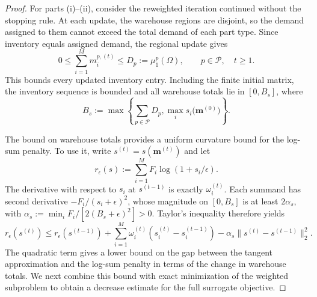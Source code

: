 \documentclass[a4paper,fleqn]{cas-sc}
\theoremstyle{remark}
\theoremstyle{plain}
\begin{document}
\begin{proof}
For parts (i)--(ii), consider the reweighted iteration continued without the stopping rule. At each update, the warehouse regions are disjoint, so the demand assigned to them cannot exceed the total demand of each part type. Since inventory equals assigned demand, the regional update gives
\[
    0\le\sum_{i=1}^M m_i^{p,(t)}\le D_p:=\mu_1^p(\Omega),\qquad p\in\mathcal P,\quad t\ge1.
\]
This bounds every updated inventory entry. Including the finite initial matrix, the inventory sequence is bounded and all warehouse totals lie in $[0,B_s]$, where
\[
    B_s:=\max\left\{\sum_{p\in\mathcal P}D_p,\max_i s_i\bigl(\mathbf m^{(0)}\bigr)\right\}.
\]

The bound on warehouse totals provides a uniform curvature bound for the log-sum penalty. To use it, write $s^{(t)}=s(\mathbf m^{(t)})$ and let
\[
    r_\epsilon(s):=\sum_{i=1}^M F_i\log(1+s_i/\epsilon).
\]
The derivative with respect to $s_i$ at $s^{(t-1)}$ is exactly $\omega_i^{(t)}$. Each summand has second derivative $-F_i/(s_i+\epsilon)^2$, whose magnitude on $[0,B_s]$ is at least $2\alpha_s$, with $\alpha_s:=\min_iF_i/[2(B_s+\epsilon)^2]>0$. Taylor's inequality therefore yields
\begin{equation}\label{eq:appendix_strict_majorization}
    r_\epsilon(s^{(t)})\le r_\epsilon(s^{(t-1)})+\sum_{i=1}^M\omega_i^{(t)}(s_i^{(t)}-s_i^{(t-1)})-\alpha_s\|s^{(t)}-s^{(t-1)}\|_2^2.
\end{equation}
The quadratic term gives a lower bound on the gap between the tangent approximation and the log-sum penalty in terms of the change in warehouse totals. We next combine this bound with exact minimization of the weighted subproblem to obtain a decrease estimate for the full surrogate objective.


\end{proof}
\end{document}
